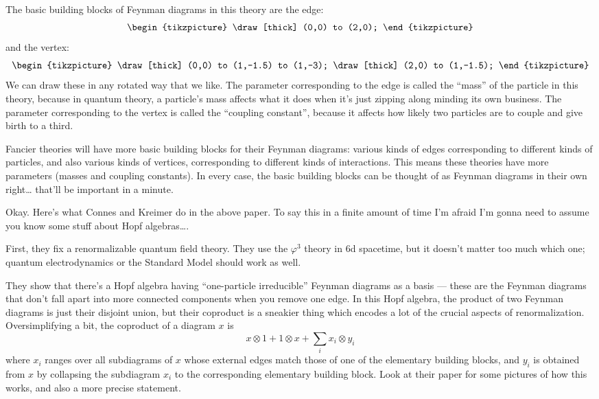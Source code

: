 \documentclass{article}
\begin{document}
The basic building blocks of Feynman diagrams in this theory are the
edge: \[
  \begin{tikzpicture}
    \draw[thick] (0,0) to (2,0);
  \end{tikzpicture}
\] and the vertex: \[
  \begin{tikzpicture}
    \draw[thick] (0,0) to (1,-1.5) to (1,-3);
    \draw[thick] (2,0) to (1,-1.5);
  \end{tikzpicture}
\] We can draw these in any rotated way that we like. The parameter
corresponding to the edge is called the ``mass'' of the particle in this
theory, because in quantum theory, a particle's mass affects what it
does when it's just zipping along minding its own business. The
parameter corresponding to the vertex is called the ``coupling
constant'', because it affects how likely two particles are to couple
and give birth to a third.

Fancier theories will have more basic building blocks for their Feynman
diagrams: various kinds of edges corresponding to different kinds of
particles, and also various kinds of vertices, corresponding to
different kinds of interactions. This means these theories have more
parameters (masses and coupling constants). In every case, the basic
building blocks can be thought of as Feynman diagrams in their own
right\ldots{} that'll be important in a minute.

Okay. Here's what Connes and Kreimer do in the above paper. To say this
in a finite amount of time I'm afraid I'm gonna need to assume you know
some stuff about Hopf algebras\ldots.

First, they fix a renormalizable quantum field theory. They use the
\(\varphi^3\) theory in 6d spacetime, but it doesn't matter too much
which one; quantum electrodynamics or the Standard Model should work as
well.

They show that there's a Hopf algebra having ``one-particle
irreducible'' Feynman diagrams as a basis --- these are the Feynman
diagrams that don't fall apart into more connected components when you
remove one edge. In this Hopf algebra, the product of two Feynman
diagrams is just their disjoint union, but their coproduct is a sneakier
thing which encodes a lot of the crucial aspects of renormalization.
Oversimplifying a bit, the coproduct of a diagram \(x\) is
\[x \otimes 1 + 1 \otimes x + \sum_i x_i \otimes y_i\] where \(x_i\)
ranges over all subdiagrams of \(x\) whose external edges match those of
one of the elementary building blocks, and \(y_i\) is obtained from
\(x\) by collapsing the subdiagram \(x_i\) to the corresponding
elementary building block. Look at their paper for some pictures of how
this works, and also a more precise statement.
\end{document}
